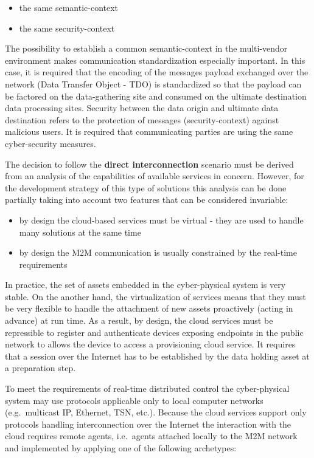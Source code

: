 \documentclass{jacsart}
\begin{document}
\begin{itemize}
  \item the same semantic-context
  \item the same security-context
\end{itemize}

The possibility to establish a common semantic-context in the multi-vendor environment makes communication standardization especially important. In this case, it is required that the encoding of the messages payload exchanged over the network (Data Transfer Object - TDO) is standardized so that the payload can be factored on the data-gathering
site and consumed on the ultimate destination data processing sites. Security between the data origin and ultimate data destination refers to the protection of messages (security-context) against malicious users. It is required that communicating parties are using the same cyber-security measures.

The decision to follow the \textbf{direct interconnection} scenario must be derived from an analysis of the capabilities of available services in concern. However, for the development strategy of this type of solutions this analysis can be done partially taking into account two features that can be considered invariable:

\begin{itemize}
  \item by design the cloud-based services must be virtual - they are used to handle many solutions at the same time
  \item by design the M2M communication is usually constrained by the real-time requirements
\end{itemize}

In practice, the set of assets embedded in the cyber-physical system is very stable. On the another hand, the virtualization of services means that they must be very flexible to handle the attachment of new assets proactively (acting in advance) at run time. As a result, by design, the cloud services must be repressible to register and authenticate devices exposing endpoints in the public network to allows the device to access a provisioning cloud service. It requires that a session over the Internet has to be established by the data holding asset at a preparation step.

To meet the requirements of real-time distributed control the cyber-physical system may use protocols applicable only to local computer networks (e.g.~multicast IP, Ethernet, TSN, etc.). Because the cloud services support only protocols handling interconnection over the Internet the interaction with the cloud requires remote agents, i.e.~agents attached locally to the M2M network and implemented by applying one of the following archetypes:
\end{document}
